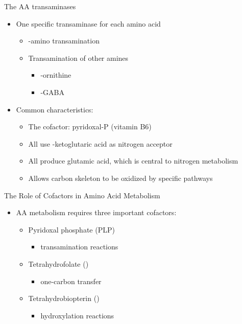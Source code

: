 \documentclass[presentation, smaller]{beamer}
\begin{document}
\begin{frame}[label={sec:orgheadline15}]{The AA transaminases}
\begin{itemize}
\item One specific transaminase for each amino acid
\begin{itemize}
\item \textalpha{}-amino transamination
\item Transamination of other amines 
\begin{itemize}
\item \textdelta{}-ornithine
\item \textgamma{}-GABA
\end{itemize}
\end{itemize}
\item Common characteristics:
\begin{itemize}
\item The cofactor: pyridoxal-P (vitamin B6)
\item All use \textalpha{}-ketoglutaric acid as nitrogen acceptor
\item All produce glutamic acid, which is central to nitrogen metabolism
\item Allows carbon skeleton to be oxidized by specific pathways
\end{itemize}
\end{itemize}
\end{frame}
\begin{frame}[label={sec:orgheadline16}]{The Role of Cofactors in Amino Acid Metabolism}
\begin{itemize}
\item AA metabolism requires three important cofactors:
\begin{itemize}
\item Pyridoxal phosphate (PLP)
\begin{itemize}
\item transamination reactions
\end{itemize}
\item Tetrahydrofolate ()
\begin{itemize}
\item one-carbon transfer
\end{itemize}
\item Tetrahydrobiopterin ()
\begin{itemize}
\item hydroxylation reactions
\end{itemize}
\end{itemize}
\end{itemize}
\end{frame}
\end{document}
